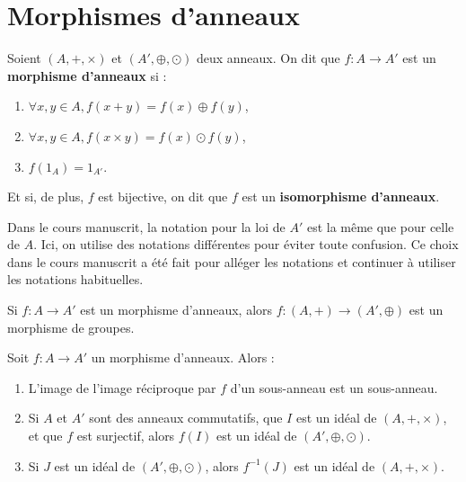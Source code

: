 \documentclass[12pt, a4paper]{report}
\begin{document}
\section{Morphismes d'anneaux}

\begin{definition}
    Soient $(A,+,\times)$ et $(A',\oplus,\odot)$ deux anneaux. On dit que $f:A\to A'$ est un \textbf{morphisme d'anneaux} si :
    \begin{enumerate}
        \item $\forall x,y \in A, f(x + y) = f(x) \oplus f(y)$,
        \item $\forall x,y \in A, f(x \times y) = f(x) \odot f(y)$,
        \item $f(1_A) = 1_{A'}$.
    \end{enumerate}
    Et si, de plus, $f$ est bijective, on dit que $f$ est un \textbf{isomorphisme d'anneaux}.
\end{definition}

\begin{attention}
    Dans le cours manuscrit, la notation pour la loi de $A'$ est la même que pour celle de $A$. Ici, on utilise des notations différentes pour éviter toute confusion. Ce choix dans le cours manuscrit a été fait pour alléger les notations et continuer à utiliser les notations habituelles.
\end{attention}

\begin{remark}
    Si $f:A\to A'$ est un morphisme d'anneaux, alors $f:(A,+)\to(A',\oplus)$ est un morphisme de groupes.
\end{remark}

\begin{property}
    Soit $f:A\to A'$ un morphisme d'anneaux. Alors :
    \begin{enumerate}
        \item L'image de l'image réciproque par $f$ d'un sous-anneau est un sous-anneau.
        \item Si $A$ et $A'$ sont des anneaux commutatifs, que $I$ est un idéal de $(A,+,\times)$, et que $f$ est surjectif, alors $f(I)$ est un idéal de $(A',\oplus,\odot)$.
        \item Si $J$ est un idéal de $(A',\oplus,\odot)$, alors $f^{-1}(J)$ est un idéal de $(A,+,\times)$.
    \end{enumerate}
\end{property}
\end{document}
